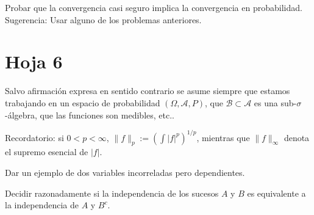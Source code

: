 
\begin{problem}[4] Probar que la convergencia casi seguro implica la convergencia en probabilidad. Sugerencia: Usar alguno de los
problemas anteriores.
\solution

\begin{expla}

\end{expla}

\end{problem}



\newpage
\section{Hoja 6}

Salvo afirmaci\'on expresa en sentido
contrario se asume siempre que estamos trabajando en un espacio de probabilidad $(\Omega, \mathcal{A}, P)$,
que  $\mathcal{B}\subset \mathcal{A}$ es una sub-$\sigma$-\'algebra, que las funciones son medibles, etc..

Recordatorio: si $0 < p < \infty$, $\|f\|_p := \left(\int|f|^p\right)^{1/p}$, mientras que
$\|f\|_\infty$ denota el supremo esencial de $|f|$. 


\begin{problem}[1] Dar un ejemplo de dos variables incorreladas pero dependientes.

\solution

\begin{expla}

\end{expla}

\end{problem}


\begin{problem}[2] Decidir razonadamente si la independencia de los sucesos $A$ y $B$ es equivalente a la independencia de $A$ y $B^c$.
\solution

\begin{expla}

\end{expla}

\end{problem}

